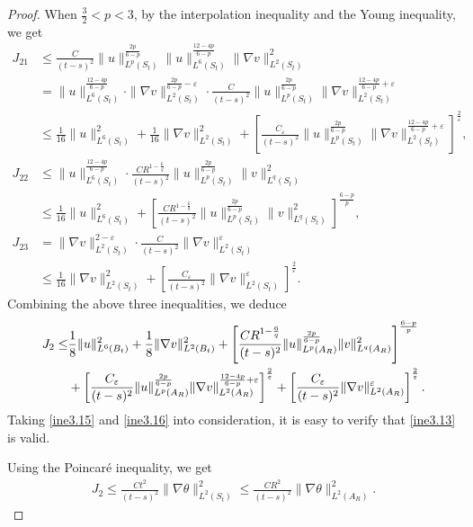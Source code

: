 \documentclass[11pt,reqno]{amsart}
\numberwithin{Thm}{section}
\begin{document}
\begin{proof}
When $\frac{3}{2} < p < 3$, by the interpolation inequality and the Young inequality, we get
\begin{align*}
J_{21}&\leq\frac{C}{(t-s)^2}\|u\|_{L^p(S_t)}^\frac{2p}{6-p}\|u\|_{L^6(S_t)}^\frac{12-4p}{6-p}\|\nabla v\|_{L^2(S_t)}^2\\
&=\|u\|_{L^6(S_t)}^\frac{12-4p}{6-p}\cdot\|\nabla v\|_{L^2(S_t)}^{\frac{2p}{6-p}-\varepsilon}\cdot\frac{C}{(t-s)^2}\|u\|_{L^p(S_t)}^\frac{2p}{6-p}\|\nabla v\|_{L^2(S_t)}^{\frac{12-4p}{6-p}+\varepsilon}\\
&\leq\frac{1}{16}\|u\|_{L^6(S_t)}^2+\frac{1}{16}\|\nabla v\|_{L^2(S_t)}^2+\left[\frac{C_\varepsilon}{(t-s)^2}\|u\|_{L^p(S_t)}^\frac{2p}{6-p}\|\nabla v\|_{L^2(S_t)}^{\frac{12-4p}{6-p}+\varepsilon}\right]^\frac{2}{\varepsilon},\\
J_{22}&\leq\|u\|_{L^6(S_t)}^\frac{12-4p}{6-p}\cdot\frac{CR^{1-\frac{6}{q}}}{(t-s)^2}\|u\|_{L^p(S_t)}^\frac{2p}{6-p}\|v\|_{L^q(S_t)}^2\\
&\leq\frac{1}{16}\|u\|_{L^6(S_t)}^2+\left[\frac{CR^{1-\frac{6}{q}}}{(t-s)^2}\|u\|_{L^p(S_t)}^\frac{2p}{6-p}\|v\|_{L^q(S_t)}^2\right]^\frac{6-p}{p},\\
J_{23}&=\|\nabla v\|_{L^2(S_t)}^{2-\varepsilon}\cdot\frac{C}{(t-s)^2}\|\nabla v\|_{L^2(S_t)}^\varepsilon\\
&\leq\frac{1}{16}\|\nabla v\|_{L^2(S_t)}^2+\left[\frac{C_\varepsilon}{(t-s)^2}\|\nabla v\|_{L^2(S_t)}^\varepsilon\right]^\frac{2}{\varepsilon}.
\end{align*}
Combining the above three inequalities, we deduce
\begin{align}
	J_2\leq&\frac{1}{8}\|u\|_{L^6(B_t)}^2+\frac{1}{8}\|\nabla v\|_{L^2(B_t)}^2+\left[\frac{C R^{1-\frac{6}{q}}}{(t-s)^2}\|u\|_{L^p(A_R)}^\frac{2p}{6-p}\|v\|_{L^q(A_R)}^2\right]^\frac{6-p}{p}\notag\\
&+\left[\frac{C_\varepsilon}{(t-s)^2}\|u\|_{L^p(A_R)}^\frac{2p}{6-p}\|\nabla v\|_{L^2(A_R)}^{\frac{12-4p}{6-p}+\varepsilon}\right]^\frac{2}{\varepsilon}+\left[\frac{C_\varepsilon}{(t-s)^2}\|\nabla v\|_{L^2(A_R)}^\varepsilon\right]^\frac{2}{\varepsilon}.\label{ine3.16}
\end{align}
Taking \eqref{ine3.15} and \eqref{ine3.16} into consideration, it is easy to verify that \eqref{ine3.13} is valid.




Using the Poincar\'{e} inequality, we get
\begin{align*}
	J_2\leq \frac{Ct^2}{(t-s)^2}\|\nabla \theta\|_{L^2(S_t)}^2\leq \frac{CR^2}{(t-s)^2}\|\nabla \theta\|_{L^2(A_R)}^2.
\end{align*}

\end{proof}
\end{document}

